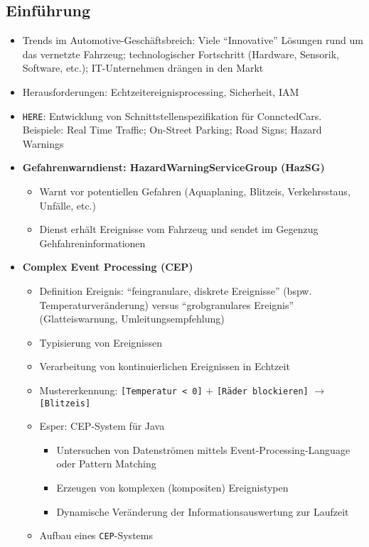 \subsection{Einführung}
\begin{itemize}
	\item Trends im Automotive-Geschäftsbreich: Viele "`Innovative"' Lösungen rund um das vernetzte Fahrzeug; technologischer Fortschritt (Hardware, Sensorik, Software, etc.); IT-Unternehmen drängen in den Markt
	\item Herausforderungen: Echtzeitereignisprocessing, Sicherheit, IAM
	\item \texttt{HERE}: Entwicklung von Schnittstellenspezifikation für ConnctedCars. Beispiele: Real Time Traffic; On-Street Parking; Road Signs; Hazard Warnings
	\item \textbf{Gefahrenwarndienst: HazardWarningServiceGroup (HazSG)}
	\begin{itemize}
		\item Warnt vor potentiellen Gefahren (Aquaplaning, Blitzeis, Verkehrsstaus, Unfälle, etc.)
		\item Dienst erhält Ereignisse vom Fahrzeug und sendet im Gegenzug Gehfahreninformationen
	\end{itemize}
	\item \textbf{Complex Event Processing (CEP)}
	\begin{itemize}
		\item Definition Ereignis: "`feingranulare, diskrete Ereignisse"' (bspw. Temperaturveränderung) versus "`grobgranulares Ereignis"' (Glatteiswarnung, Umleitungsempfehlung)
		\item Typisierung von Ereignissen
		\item Verarbeitung von kontinuierlichen Ereignissen in Echtzeit
		\item Mustererkennung: \texttt{[Temperatur < 0]} \(+\) \texttt{[Räder blockieren]} \(\rightarrow\) \texttt{[Blitzeis]}
		\item Esper: CEP-System für Java
		\begin{itemize}
			\item Untersuchen von Datenströmen mittels Event-Processing-Language oder Pattern Matching
			\item Erzeugen von komplexen (kompositen) Ereignistypen
			\item Dynamische Veränderung der Informationsauswertung zur Laufzeit
		\end{itemize}
		\item Aufbau eines \texttt{CEP}-Systems

\end{itemize}
\end{itemize}
